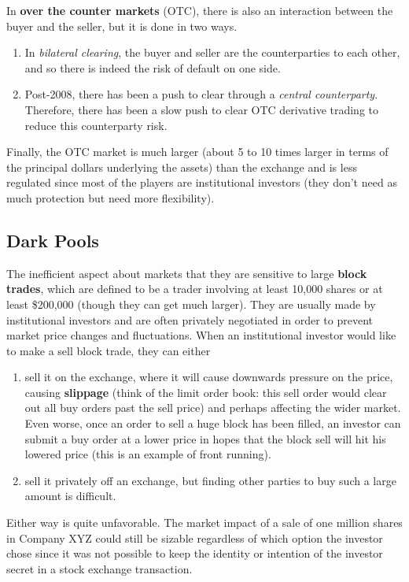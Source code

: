\documentclass{article}
\begin{document}
    \begin{definition}
      In \textbf{over the counter markets} (OTC), there is also an interaction between the buyer and the seller, but it is done in two ways. 
      \begin{enumerate}
        \item In \textit{bilateral clearing}, the buyer and seller are the counterparties to each other, and so there is indeed the risk of default on one side. 
        \item Post-2008, there has been a push to clear through a \textit{central counterparty}. Therefore, there has been a slow push to clear OTC derivative trading to reduce this counterparty risk. 
      \end{enumerate}
      Finally, the OTC market is much larger (about 5 to 10 times larger in terms of the principal dollars underlying the assets) than the exchange and is less regulated since most of the players are institutional investors (they don't need as much protection but need more flexibility).  
    \end{definition}

  \subsection{Dark Pools}

    The inefficient aspect about markets that they are sensitive to large \textbf{block trades}, which are defined to be a trader involving at least 10,000 shares or at least \$200,000 (though they can get much larger). They are usually made by institutional investors and are often privately negotiated in order to prevent market price changes and fluctuations. When an institutional investor would like to make a sell block trade, they can either 
    \begin{enumerate}
        \item sell it on the exchange, where it will cause downwards pressure on the price, causing \textbf{slippage} (think of the limit order book: this sell order would clear out all buy orders past the sell price) and perhaps affecting the wider market. Even worse, once an order to sell a huge block has been filled, an investor can submit a buy order at a lower price in hopes that the block sell will hit his lowered price (this is an example of front running). 
        \item sell it privately off an exchange, but finding other parties to buy such a large amount is difficult. 
    \end{enumerate}
    Either way is quite unfavorable. The market impact of a sale of one million shares in Company XYZ could still be sizable regardless of which option the investor chose since it was not possible to keep the identity or intention of the investor secret in a stock exchange transaction. 
\end{document}

